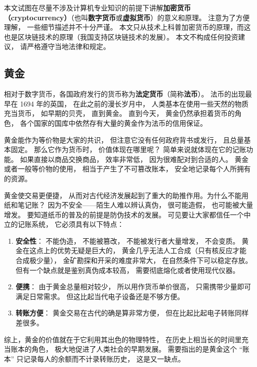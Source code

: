 
本文试图在尽量不涉及计算机专业知识的前提下讲解\textbf{加密货币（cryptocurrency）}（也叫\textbf{数字货币}或\textbf{虚拟货币}）的意义和原理。 注意为了方便理解， 一些细节描述并不十分严谨。 本文只从技术上科普加密货币的原理，而这也是区块链技术的原理（我国支持区块链技术的发展）。 本文不构成任何投资建议， 请严格遵守当地法律和规定。

\subsection{黄金}
相对于数字货币，各国政府发行的货币称为\textbf{法定货币}（简称\textbf{法币}）。 法币的出现最早在 1694 年的英国， 在此之前的漫长岁月中， 人类基本在使用一些天然的物质充当货币， 如早期的贝壳， 直到黄金。 直到今天， 黄金仍然承担着货币的角色， 各个国家的国库中依然存有大量的黄金作为法币的信用保证。

黄金能作为等价物是大家的共识， 但注意它没有任何政府背书或发行， 且总量基本固定。 那么它作为货币时， 价值体现在哪里呢？ 简单来说就体现在它的记账功能。 如果直接以商品交换商品， 效率非常低， 因为很难配对到合适的人。 黄金或者一般等价物的使用， 相当于产生了不可篡改账本， 安全地记录每个人所拥有的资源。

黄金使交易更便捷， 从而对古代经济发展起到了重大的助推作用。为什么不能用纸和笔记账？ 因为不安全——陌生人难以辨认真伪， 很可能造假， 也可能被大量增发。 要知道纸币的普及的前提是防伪技术的发展。 可见要让大家都信任一个中立的记账系统， 它必须具有以下特点：
\begin{enumerate}
\item \textbf{安全性}： 不能伪造， 不能被篡改， 不能被发行者大量增发， 不会变质。 黄金在这点上的优势无疑是巨大的， 黄金几乎无法人工合成（只有核反应才能合成极少量）， 金矿勘探和开采的难度非常大， 在自然条件下可以稳定存放。 但有一个缺点就是鉴别真伪成本较高， 需要彻底熔化或者使用现代仪器。
\item \textbf{便携}： 由于黄金总量相对较少， 所以用作货币单价很高， 只需携带少量即可满足日常需求。 但这比起当代电子设备还是不够方便。
\item \textbf{转账方便}： 黄金交易在古代的确是算非常方便， 但在比起比起电子转账同样差很多。
\end{enumerate}

综上，黄金的价值就在于它利用其出色的物理特性， 在历史上相当长的时间里充当账本的角色， 极大地促进了人类社会的早期发展。 需要指出的是黄金这个 “账本” 只记录每人的余额而不计录转账历史， 这是又一缺点。

